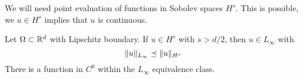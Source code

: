 \bigskip


We will need point evaluation of functions in Sobolev spaces $H^s$. This is
possible, we $u \in H^s$ implies that $u$ is continuous. 
\begin{theorem} Let $\Omega \subset {\mathbb R}^d$ with Lipschitz boundary. If $u \in H^s$ with $s > d/2$, then $u \in L_\infty$
with
$$
\| u \|_{L_\infty} \preceq \| u \|_{H^s}
$$
There is a function in $C^0$ within the $L_\infty$ equivalence class.
\end{theorem}


